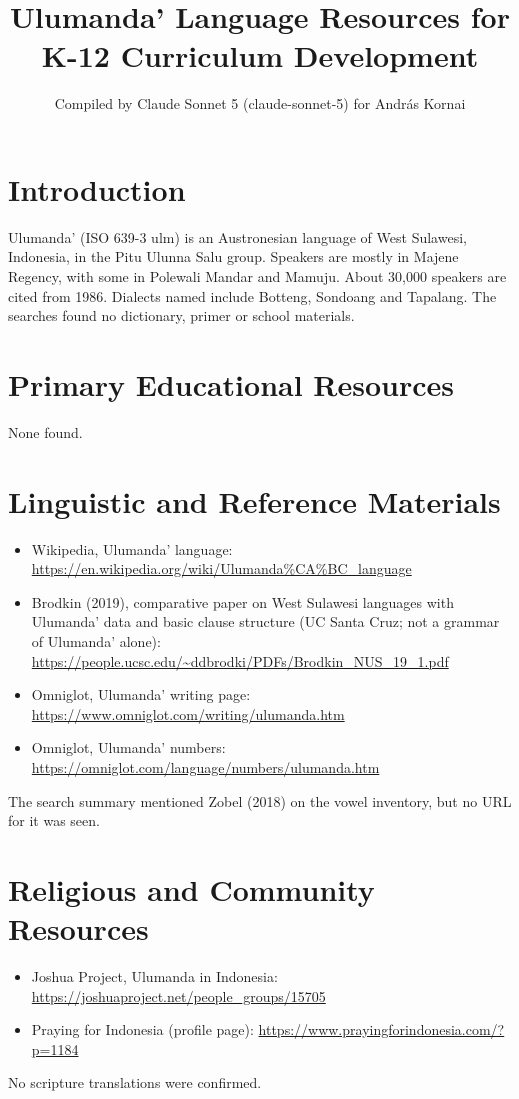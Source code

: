 \documentclass[12pt]{article}
\title{Ulumanda' Language Resources for K-12 Curriculum Development}
\author{Compiled by Claude Sonnet 5 (claude-sonnet-5) for Andr\'as Kornai}
\date{}
\begin{document}
\maketitle

\section{Introduction}
Ulumanda' (ISO 639-3 ulm) is an Austronesian language of West Sulawesi, Indonesia, in the Pitu Ulunna Salu group. Speakers are mostly in Majene Regency, with some in Polewali Mandar and Mamuju. About 30,000 speakers are cited from 1986. Dialects named include Botteng, Sondoang and Tapalang. The searches found no dictionary, primer or school materials.

\section{Primary Educational Resources}
None found.

\section{Linguistic and Reference Materials}
\begin{itemize}
\item Wikipedia, Ulumanda' language: \url{https://en.wikipedia.org/wiki/Ulumanda%CA%BC_language}
\item Brodkin (2019), comparative paper on West Sulawesi languages with Ulumanda' data and basic clause structure (UC Santa Cruz; not a grammar of Ulumanda' alone): \url{https://people.ucsc.edu/~ddbrodki/PDFs/Brodkin_NUS_19_1.pdf}
\item Omniglot, Ulumanda' writing page: \url{https://www.omniglot.com/writing/ulumanda.htm}
\item Omniglot, Ulumanda' numbers: \url{https://omniglot.com/language/numbers/ulumanda.htm}
\end{itemize}
The search summary mentioned Zobel (2018) on the vowel inventory, but no URL for it was seen.

\section{Religious and Community Resources}
\begin{itemize}
\item Joshua Project, Ulumanda in Indonesia: \url{https://joshuaproject.net/people_groups/15705}
\item Praying for Indonesia (profile page): \url{https://www.prayingforindonesia.com/?p=1184}
\end{itemize}
No scripture translations were confirmed.
\end{document}

